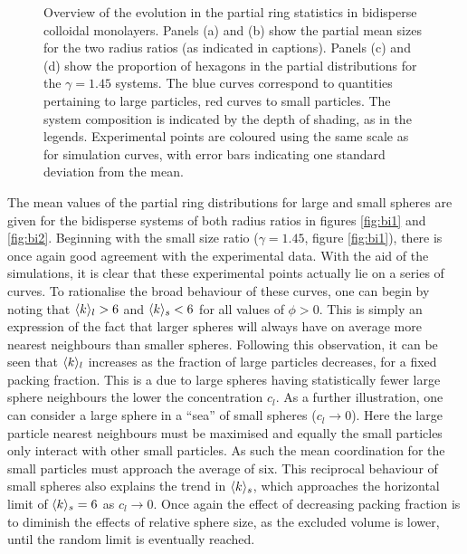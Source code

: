 \begin{figure}[bt]
     \caption{Overview of the evolution in the partial ring statistics in bidisperse colloidal monolayers. Panels (a) and (b) show the partial mean sizes for the two radius ratios (as indicated in captions). Panels (c) and (d) show the proportion of hexagons in the partial distributions for the $\gamma=1.45$ systems. The blue curves correspond to quantities pertaining to large particles, red curves to small particles. The system composition is indicated by the depth of shading, as in the legends. Experimental points are coloured using the same scale as for simulation curves, with error bars indicating one standard deviation from the mean.}
     \label{fig:bi}
\end{figure}

The mean values of the partial ring distributions for large and small spheres are given for the bidisperse systems of both radius ratios in figures \ref{fig:bi1} and \ref{fig:bi2}.
Beginning with the small size ratio ($\gamma=1.45$, figure \ref{fig:bi1}), there is once again good agreement with the experimental data.
With the aid of the \mc{} simulations, it is clear that these experimental points actually lie on a series of curves.
To rationalise the broad behaviour of these curves, one can begin by noting that $\langle k \rangle_l>6$ and $\langle k \rangle_s<6$ for all values of $\phi>0$.
This is simply an expression of the fact that larger spheres will always have on average more nearest neighbours than smaller spheres.
Following this observation, it can be seen that $\langle k \rangle_l$ increases as the fraction of large particles decreases, for a fixed packing fraction.
This is a due to large spheres having statistically fewer large sphere neighbours the lower the concentration $c_l$.
As a further illustration, one can consider a large sphere in a ``sea'' of small spheres ($c_l\rightarrow 0$).
Here the large particle nearest neighbours must be maximised and equally the small particles only interact with other small particles.
As such the mean coordination for the small particles must approach the average of six.
This reciprocal behaviour of small spheres also explains the trend in $\langle k \rangle_s$, which approaches the horizontal limit of $\langle k \rangle_s=6$ as $c_l\rightarrow 0$.
Once again the effect of decreasing packing fraction is to diminish the effects of relative sphere size, as the excluded volume is lower, until the random limit is eventually reached.


